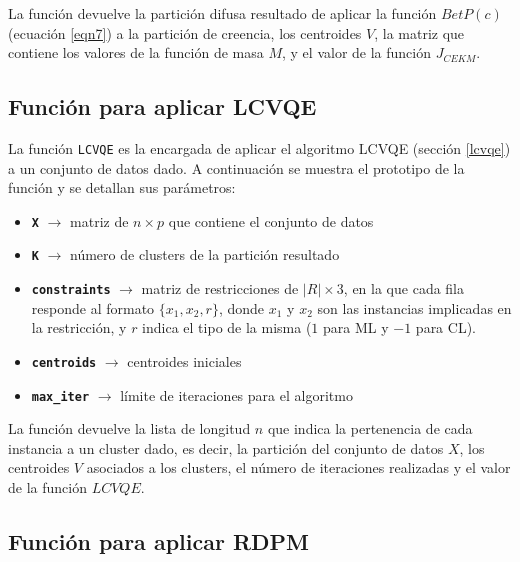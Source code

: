 La función devuelve la partición difusa resultado de aplicar la función $BetP(c)$ (ecuación \ref{eqn7}) a la partición de creencia, los centroides $V$, la matriz que contiene los valores de la función de masa $M$, y el valor de la función $J_{CEKM}$.

\subsection{Función para aplicar LCVQE}

La función \texttt{LCVQE} es la encargada de aplicar el algoritmo \acs{LCVQE} (sección \ref{lcvqe}) a un conjunto de datos dado. A continuación se muestra el prototipo de la función y se detallan sus parámetros:


\begin{itemize}
	
	\item \textbf{\texttt{X}} {$\longrightarrow$ matriz de $n \times p$ que contiene el conjunto de datos}
	
	\item \textbf{\texttt{K}} {$\longrightarrow$ número de clusters de la partición resultado}
	
	\item \textbf{\texttt{constraints}} {$\longrightarrow$ matriz de restricciones de $|R| \times 3$, en la que cada fila responde al formato $\{x_1, x_2, r\}$, donde $x_1$ y $x_2$ son las instancias implicadas en la restricción, y $r$ indica el tipo de la misma ($1$ para \acs{ML} y $-1$ para \acs{CL}).}
	
	\item \textbf{\texttt{centroids}} {$\longrightarrow$ centroides iniciales}
	
	\item \textbf{\texttt{max\_iter}} {$\longrightarrow$ límite de iteraciones para el algoritmo}
	
\end{itemize}

La función devuelve la lista de longitud $n$ que indica la pertenencia de cada instancia a un cluster dado, es decir, la partición del conjunto de datos $X$, los centroides $V$ asociados a los clusters, el número de iteraciones realizadas y el valor de la función $LCVQE$.

\subsection{Función para aplicar RDPM}

